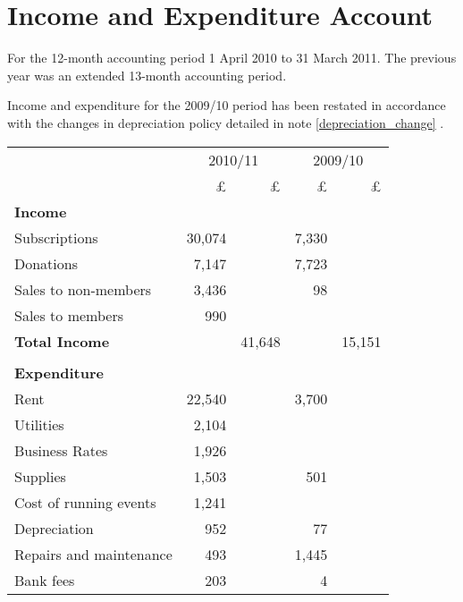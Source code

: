 \section{Income and Expenditure Account}
For the 12-month accounting period 1 April 2010 to 31 March 2011.
The previous year was an extended 13-month accounting period.

Income and expenditure for the 2009/10 period has been restated in accordance
with the changes in depreciation policy detailed in note \ref{depreciation_change} .

\begin{center}
\begin{tabular}{ l  r  r r r }
\toprule
            & \multicolumn{2}{c}{2010/11}  & \multicolumn{2}{c}{2009/10} \\
\cmidrule(r){2-3} \cmidrule(r){4-5}
                            & £      & £      & £     & £     \\
{\bf Income}                &        &        &       &       \\
Subscriptions               & 30,074 &        & 7,330 &       \\
Donations                   & 7,147  &        & 7,723 &       \\
Sales to non-members        & 3,436  &        & 98    &       \\
Sales to members            & 990    &        &       &       \\
{\bf Total Income}          &        & 41,648 &       & 15,151 \\
\cmidrule(r){2-3} \cmidrule(r){4-5} \\
{\bf Expenditure}           &        &        &       &         \\
Rent                        & 22,540 &        & 3,700 &         \\
Utilities                   & 2,104  &        &       &   \\
Business Rates              & 1,926  &        &       &   \\
Supplies                    & 1,503  &        & 501   &   \\
Cost of running events      & 1,241  &        &       &   \\
Depreciation                & 952    &        & 77    &   \\
Repairs and maintenance     & 493    &        & 1,445 &         \\
Bank fees                   & 203    &        & 4     &   \\

\end{tabular}
\end{center}
